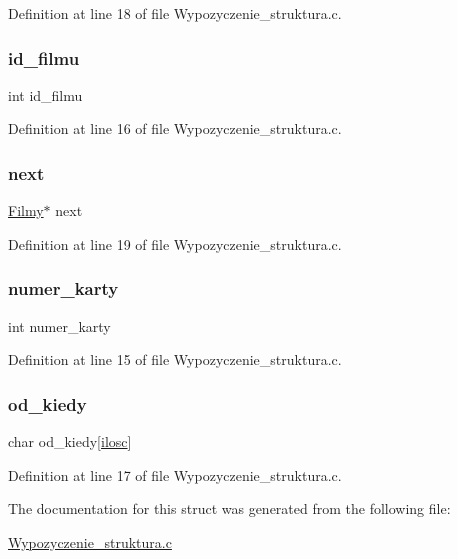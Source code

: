 Definition at line 18 of file Wypozyczenie\+\_\+struktura.\+c.

\mbox{\label{struct_f_i_l_m_y_aecdfe8f01c61387a7582c4549735d270}} 
\subsubsection{\texorpdfstring{id\+\_\+filmu}{id\_filmu}}
{\footnotesize\ttfamily int id\+\_\+filmu}



Definition at line 16 of file Wypozyczenie\+\_\+struktura.\+c.

\mbox{\label{struct_f_i_l_m_y_aa03a81bcff76f1e4a34c0f7cf2dd5241}} 
\subsubsection{\texorpdfstring{next}{next}}
{\footnotesize\ttfamily \hyperlink{_wypozyczenie__struktura_8c_aedefc373cfe2ed0d3900e3eeae23e46c}{Filmy}$\ast$ next}



Definition at line 19 of file Wypozyczenie\+\_\+struktura.\+c.

\mbox{\label{struct_f_i_l_m_y_ac06e2ac007dc7c50c5b41b72a68c13c4}} 
\subsubsection{\texorpdfstring{numer\+\_\+karty}{numer\_karty}}
{\footnotesize\ttfamily int numer\+\_\+karty}



Definition at line 15 of file Wypozyczenie\+\_\+struktura.\+c.

\mbox{\label{struct_f_i_l_m_y_ac1e0a7d2316abe4942bc38dcd2a48520}} 
\subsubsection{\texorpdfstring{od\+\_\+kiedy}{od\_kiedy}}
{\footnotesize\ttfamily char od\+\_\+kiedy\mbox{[}\hyperlink{_wypozyczenie__struktura_8c_a802c84452854799df868a4a660d3d58a}{ilosc}\mbox{]}}



Definition at line 17 of file Wypozyczenie\+\_\+struktura.\+c.



The documentation for this struct was generated from the following file\+:\begin{DoxyCompactItemize}
\item 
\hyperlink{_wypozyczenie__struktura_8c}{Wypozyczenie\+\_\+struktura.\+c}\end{DoxyCompactItemize}

